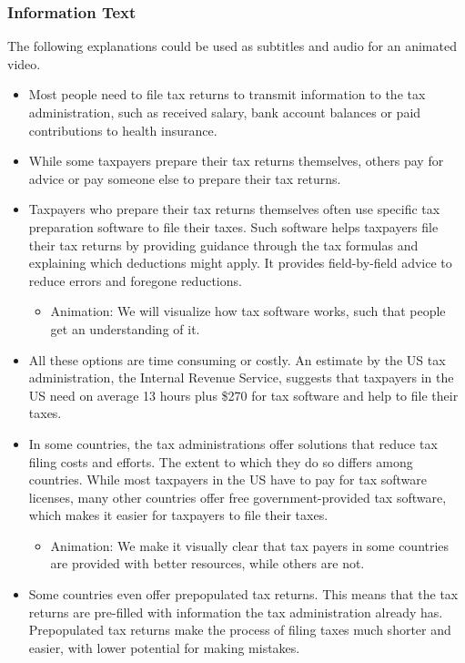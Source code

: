\documentclass[11pt]{article}
\begin{document}
\subsubsection*{Information Text}
The following explanations could be used as subtitles and audio for an animated video.
\begin{itemize}
    \item Most people need to file tax returns to transmit information to the tax administration, such as received salary, bank account balances or paid contributions to health insurance.
    \item While some taxpayers prepare their tax returns themselves, others pay for advice or pay someone else to prepare their tax returns. 
    \item Taxpayers who prepare their tax returns themselves often use specific tax preparation software to file their taxes. Such software helps taxpayers file their tax returns by providing guidance through the tax formulas and explaining which deductions might apply. It provides field-by-field advice to reduce errors and foregone reductions.
    \begin{itemize}
        \item Animation: We will visualize how tax software works, such that people get an understanding of it. 
    \end{itemize}
    \item All these options are time consuming or costly. An estimate by the US tax administration, the Internal Revenue Service, suggests that taxpayers in the US need on average  13 hours plus \$270 for tax software and help to file their taxes.
    \item In some countries, the tax administrations offer solutions that reduce tax filing costs and efforts. The extent to which they do so differs among countries. While most taxpayers in the US have to pay for tax software licenses, many other countries offer free government-provided tax software, which makes it easier for taxpayers to file their taxes. 
    \begin{itemize}
        \item Animation: We make it visually clear that tax payers in some countries are provided with better resources, while others are not. 
    \end{itemize}
    \item Some countries even offer prepopulated tax returns. This means that the tax returns are pre-filled with information the tax administration already has. Prepopulated tax returns make the process of filing taxes much shorter and easier, with lower potential for making mistakes.

\end{itemize}
\end{document}
